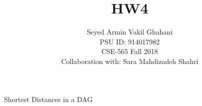 \documentclass[12pt]{article}
\newenvironment{problem}[2][Problem]{\begin{trivlist}
\item[\hskip \labelsep {\bfseries #1}\hskip \labelsep {\bfseries #2.}]}{\end{trivlist}}
\begin{document}
 
\title{\textbf{HW4}}%
\author{Seyed Armin Vakil Ghahani\\ %
PSU ID: 914017982\\
CSE-565 Fall 2018\\
Collaboration with:
Sara Mahdizadeh Shahri} %
 
\maketitle
\begin{problem}{1}
Shortest Distances in a DAG
\end{problem}
\end{document}
